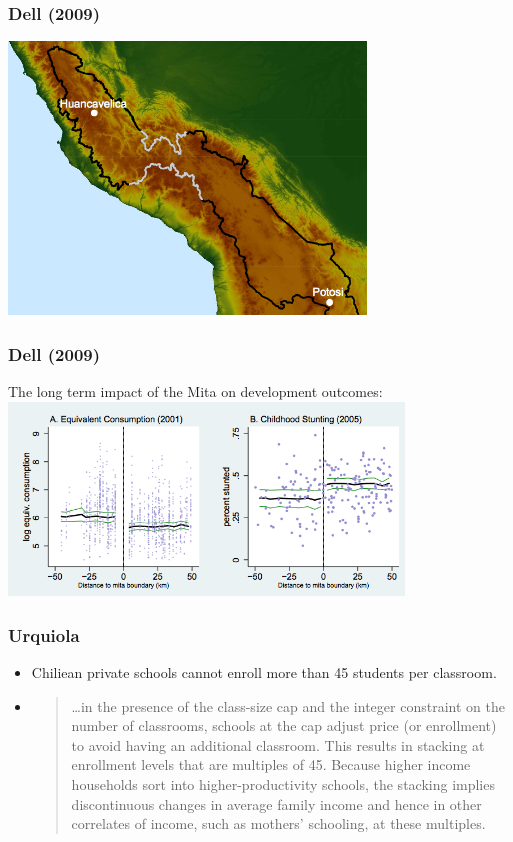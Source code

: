 \documentclass{beamer}
\begin{document}
\begin{frame}
  \frametitle{Dell (2009)}

\includegraphics[width=9.5cm]{Mita_boundary.png}  
\end{frame}

\begin{frame}
  \frametitle{Dell (2009)}
The long term impact of the Mita on development outcomes:
  \includegraphics[width=10.5cm]{Mita_results.png}  
\end{frame}

\begin{frame}[c]\frametitle{Urquiola}
	\begin{itemize}
		\item<+-> Chiliean private schools cannot enroll more than 45 students per classroom.
		\item<+->  
		\begin{quote}
			\dots in the presence of the class-size cap and the integer constraint on the number of classrooms, schools at the cap adjust price (or enrollment) to avoid having an additional classroom. This results in stacking at enrollment levels that are multiples of 45. Because higher income households sort into higher-productivity schools, the stacking implies discontinuous changes in average family income and hence in other correlates of income, such as mothers' schooling, at these multiples.
		\end{quote}
	\end{itemize}
\end{frame}
\end{document}
